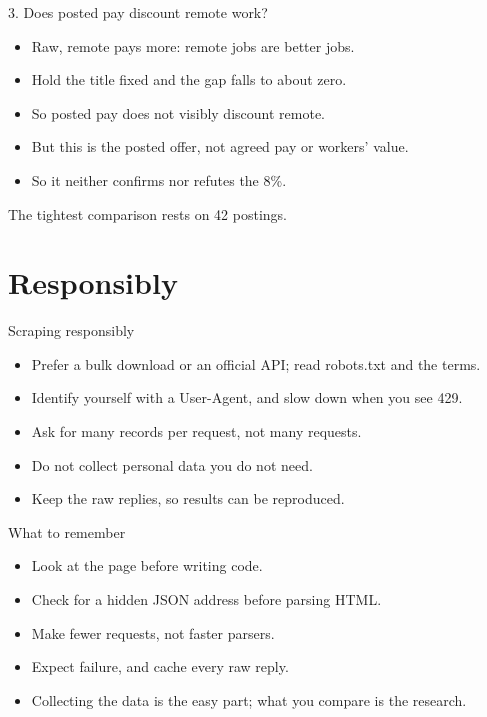 \documentclass[11pt,aspectratio=169]{beamer}
\newenvironment{wideitemize}
  {\begin{itemize}\setlength{\itemsep}{10pt}}
  {\end{itemize}}
\begin{document}
\begin{frame}{3. Does posted pay discount remote work?}
\begin{wideitemize}
  \item Raw, remote pays more: remote jobs are better jobs.
  \item Hold the title fixed and the gap falls to about zero.
  \item So posted pay does not visibly discount remote.
  \item But this is the posted offer, not agreed pay or workers' value.
  \item So it neither confirms nor refutes the 8\%.
\end{wideitemize}

\vspace{0.6em}
{\footnotesize The tightest comparison rests on 42 postings.}
\end{frame}

\section{Responsibly}
\begin{frame}{Scraping responsibly}
\begin{wideitemize}
  \item Prefer a bulk download or an official API; read robots.txt and the terms.
  \item Identify yourself with a User-Agent, and slow down when you see 429.
  \item Ask for many records per request, not many requests.
  \item Do not collect personal data you do not need.
  \item Keep the raw replies, so results can be reproduced.
\end{wideitemize}
\end{frame}

\begin{frame}{What to remember}
\begin{wideitemize}
  \item Look at the page before writing code.
  \item Check for a hidden JSON address before parsing HTML.
  \item Make fewer requests, not faster parsers.
  \item Expect failure, and cache every raw reply.
  \item Collecting the data is the easy part; what you compare is the research.
\end{wideitemize}
\end{frame}
\end{document}
